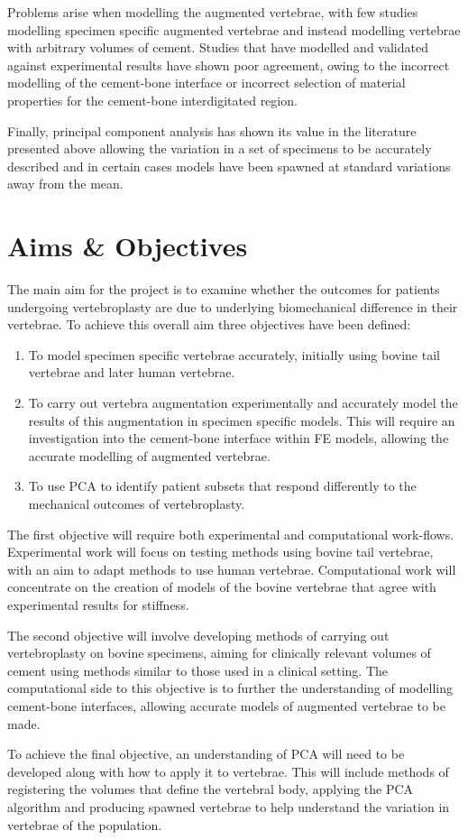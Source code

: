 Problems arise when modelling the augmented vertebrae, with few studies modelling specimen specific augmented vertebrae and instead modelling vertebrae with arbitrary volumes of cement. Studies that have modelled and validated against experimental results have shown poor agreement, owing to the incorrect modelling of the cement-bone interface or incorrect selection of material properties for the cement-bone interdigitated region.

Finally, principal component analysis has shown its value in the literature presented above allowing the variation in a set of specimens to be accurately described and in certain cases models have been spawned at standard variations away from the mean.

\section{Aims \& Objectives}

The main aim for the project is to examine whether the outcomes for patients undergoing vertebroplasty are due to underlying biomechanical difference in their vertebrae. To achieve this overall aim three objectives have been defined:
\begin{enumerate}
\item To model specimen specific vertebrae accurately, initially using bovine tail vertebrae and later human vertebrae.
\item To carry out vertebra augmentation experimentally and accurately model the results of this augmentation in specimen specific models. This will require an investigation into the cement-bone interface within FE models, allowing the accurate modelling of augmented vertebrae.
\item To use PCA to identify patient subsets that respond differently to the mechanical outcomes of vertebroplasty.

\end{enumerate}

The first objective will require both experimental and computational work-flows.
Experimental work will focus on testing methods using bovine tail vertebrae, with an aim to adapt methods to use human vertebrae.
Computational work will concentrate on the creation of models of the bovine vertebrae that agree with experimental results for stiffness.

The second objective will involve developing methods of carrying out vertebroplasty on bovine specimens, aiming for clinically relevant volumes of cement using methods similar to those used in a clinical setting.
The computational side to this objective is to further the understanding of modelling cement-bone interfaces, allowing accurate models of augmented vertebrae to be made.

To achieve the final objective, an understanding of PCA will need to be developed along with how to apply it to vertebrae.
This will include methods of registering the volumes that define the vertebral body, applying the PCA algorithm and producing spawned vertebrae to help understand the variation in vertebrae of the population.

\pagebreak
